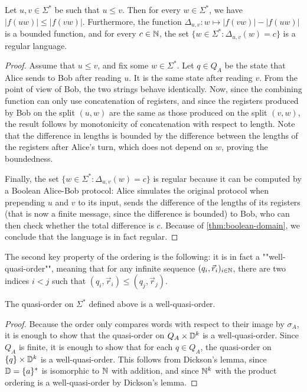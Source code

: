 \begin{lemma}
  \label{lemma:order-monotonicity-unary-output}
  Let $u, v \in \Sigma^*$ be such that $u \leq v$. Then for every $w \in
  \Sigma^*$, we have $|f(uw)| \leq |f(vw)|$. Furthermore, the function 
  $\Delta_{u,v} : w \mapsto |f(vw)| - |f(uw)|$ is a bounded function, and for 
  every $c \in {\mathbb N}$, the set $\{ w \in \Sigma^* : \Delta_{u,v}(w) = c\}$ is
  a regular language.
\end{lemma}
\begin{proof}
  Assume that $u \leq v$, and fix some $w \in \Sigma^*$.
  Let $q \in Q_A$ be the state that Alice sends to Bob after reading $u$.
  It is the same state after reading $v$. From the point of view of 
  Bob, the two strings behave identically. Now, since the combining function
  can only use concatenation of registers, and since the registers produced by
  Bob on the split $(u, w)$ are the same as those produced on the split
  $(v, w)$, the result follows by monotonicity of concatenation with respect to
  length. Note that the difference in lengths is bounded by the difference 
  between the lengths of the registers after Alice's turn, which does not 
  depend on $w$, proving the boundedness.

  Finally, the set $\{ w \in \Sigma^* : \Delta_{u,v}(w) = c\}$ is regular because it
  can be computed by a Boolean Alice-Bob protocol: Alice simulates the original protocol
  when prepending $u$ and $v$ to its input, sends the difference of the lengths 
  of its registers (that is now a finite message, since the difference is bounded) to Bob,
  who can then check whether the total difference is $c$.
  Because of \cref{thm:boolean-domain}, we conclude that the language is in fact regular.
\end{proof}

The second key property of the ordering is the following: it is in fact a
""well-quasi-order"", meaning that for any infinite sequence $(q_i,
\vec{r}_i)_{i \in {\mathbb N}}$, there are two indices $i < j$ such that $(q_i,
\vec{r}_i) \leq (q_j, \vec{r}_j)$. 

\begin{lemma}
  \label{lemma:wqo-unary-output}
  The quasi-order on $\Sigma^*$ defined above is a well-quasi-order.
\end{lemma}
\begin{proof}
  Because the order only compares words with respect to their image by
  $\sigma_A$, it is enough to show that the quasi-order on $Q_A \times
  \mathbb D^k$ is a well-quasi-order.
  Since $Q_A$ is finite, it is enough to show that for each $q \in Q_A$,
  the quasi-order on $\{q\} \times \mathbb D^k$ is a well-quasi-order.
  This follows from Dickson's lemma, since $\mathbb D = \{a\}^*$ is isomorphic
  to ${\mathbb N}$ with addition, and since ${\mathbb N}^k$ with the product ordering is a
  well-quasi-order by Dickson's lemma.
\end{proof}


